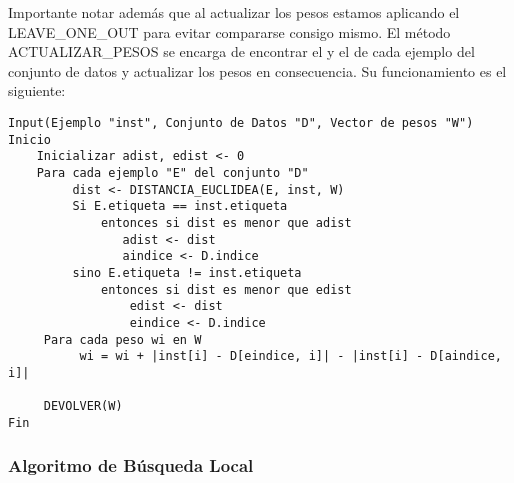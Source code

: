 Importante notar además que al actualizar los pesos estamos aplicando el LEAVE\_ONE\_OUT para evitar compararse consigo mismo. El método ACTUALIZAR\_PESOS se encarga de encontrar el  y el  de cada ejemplo del conjunto de datos y actualizar los pesos en consecuencia. Su funcionamiento es el siguiente:

\begin{verbatim}
Input(Ejemplo "inst", Conjunto de Datos "D", Vector de pesos "W")
Inicio
    Inicializar adist, edist <- 0
    Para cada ejemplo "E" del conjunto "D"
         dist <- DISTANCIA_EUCLIDEA(E, inst, W)
         Si E.etiqueta == inst.etiqueta
             entonces si dist es menor que adist
             	adist <- dist
             	aindice <- D.indice
         sino E.etiqueta != inst.etiqueta
             entonces si dist es menor que edist
                 edist <- dist
                 eindice <- D.indice
     Para cada peso wi en W
          wi = wi + |inst[i] - D[eindice, i]| - |inst[i] - D[aindice, i]|
          
     DEVOLVER(W)
Fin
\end{verbatim}

\subsubsection{Algoritmo de Búsqueda Local}

